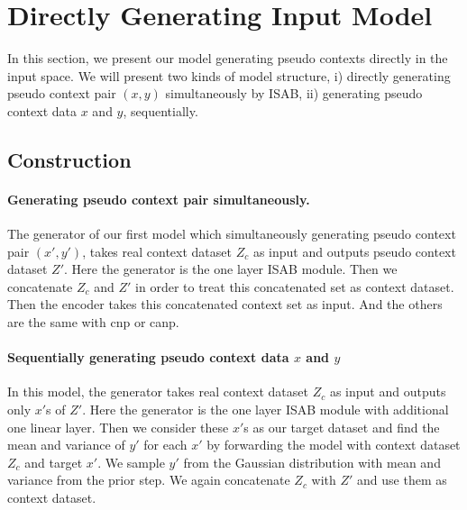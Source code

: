 \section{Directly Generating Input Model}
\label{app:sec:directly_generating_input}
In this section, we present our model generating pseudo contexts directly in the input space.
We will present two kinds of model structure, i) directly generating pseudo context pair $(x,y)$ simultaneously by ISAB, ii) generating pseudo context data $x$ and $y$, sequentially. 
\subsection{Construction}
\paragraph{Generating pseudo context pair simultaneously.}
The generator of our first model which simultaneously generating pseudo context pair $(x',y')$, takes real context dataset $Z_c$ as input and outputs pseudo context dataset $Z'$. 
Here the generator is the one layer ISAB module.
Then we concatenate $Z_c$ and $Z'$ in order to treat this concatenated set as context dataset.
Then the encoder takes this concatenated context set as input.
And the others are the same with \gls{cnp} or \gls{canp}.
\paragraph{Sequentially generating pseudo context data \texorpdfstring{$x$}{x} and \texorpdfstring{$y$}{y}}
In this model, the generator takes real context dataset $Z_c$ as input and outputs only $x'$s of $Z'$. 
Here the generator is the one layer ISAB module with additional one linear layer.
Then we consider these $x'$s as our target dataset and find the mean and variance of $y'$ for each $x'$ by forwarding the model with context dataset $Z_c$ and target $x'$.
We sample $y'$ from the Gaussian distribution with mean and variance from the prior step.
We again concatenate $Z_c$ with $Z'$ and use them as context dataset.

